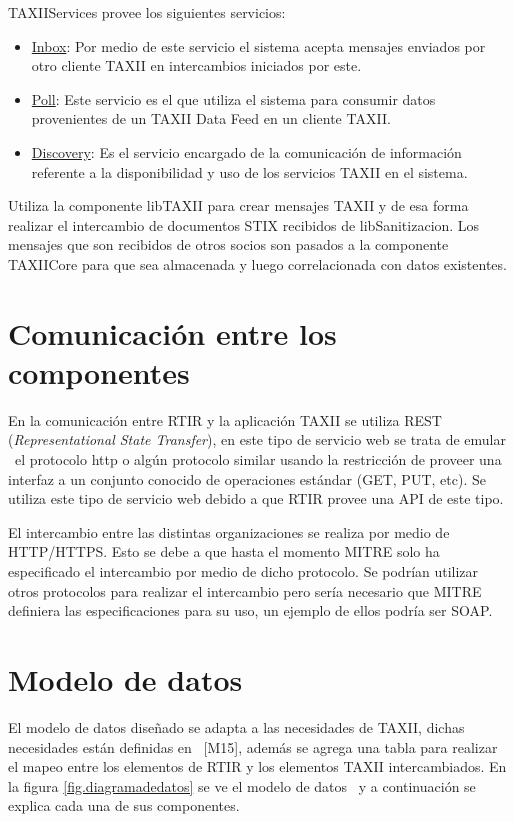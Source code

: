 	TAXIIServices provee los siguientes servicios:
	
	\begin{itemize}
		\item \underline{Inbox}: Por medio de este servicio el sistema acepta mensajes enviados por otro cliente
			TAXII en intercambios iniciados por este.
		\item \underline{Poll}: Este servicio es el que utiliza el sistema para consumir datos provenientes de un
			TAXII Data Feed en un cliente TAXII.
		\item \underline{Discovery}: Es el servicio encargado de la comunicación de información referente a la
			disponibilidad y uso de los servicios TAXII en el sistema.
	\end{itemize}
	
	\bigskip
	
	Utiliza la componente libTAXII para crear mensajes TAXII y de esa forma realizar el
		intercambio de documentos STIX recibidos de libSanitizacion. Los mensajes que son recibidos de otros socios son pasados
		a la componente TAXIICore para que sea almacenada y luego correlacionada con datos existentes.
	
	
	\bigskip
	
	\section{Comunicación entre los componentes}
	
	\bigskip
	
	En la comunicación entre RTIR y la aplicación TAXII se utiliza REST (\textit{Representational State
		Transfer}), en este tipo de servicio web se trata de emular \ el protocolo http o algún protocolo similar usando la
		restricción de proveer una interfaz a un conjunto conocido de operaciones estándar (GET, PUT, etc). Se utiliza este
		tipo de servicio web debido a que RTIR provee una API de este tipo.
	
	
	\bigskip
	
	El intercambio entre las distintas organizaciones se realiza por medio de HTTP/HTTPS. Esto se
		debe a que hasta el momento MITRE solo ha especificado el intercambio por medio de dicho protocolo. Se podrían utilizar
		otros protocolos para realizar el intercambio pero sería necesario que MITRE definiera las especificaciones para su
		uso, un ejemplo de ellos podría ser SOAP.

	
	\bigskip
	
	\section{Modelo de datos}
	El modelo de datos diseñado se adapta a las necesidades de TAXII, dichas necesidades están
		definidas en \ [M15], además se agrega una tabla para realizar el mapeo entre los elementos de RTIR y los elementos
		TAXII intercambiados. En la figura \ref{fig.diagramadedatos} se ve el modelo de datos \ y a continuación se explica cada una de sus
		componentes.
	
